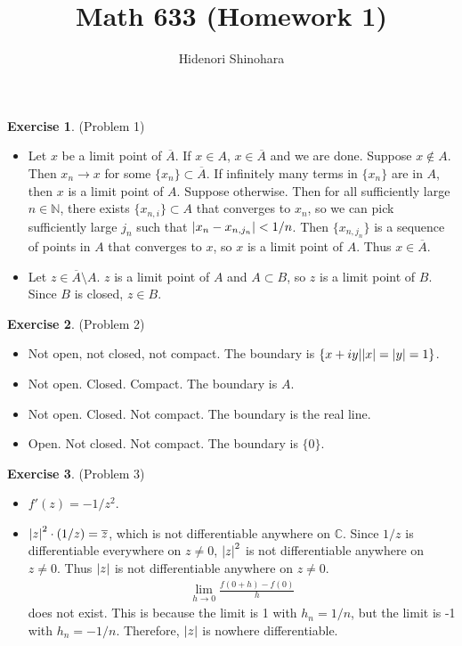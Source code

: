 \documentclass[12pt, psamsfonts]{amsart}
\theoremstyle{definition}
\newtheorem*{exer}{Exercise}
\theoremstyle{remark}
\numberwithin{equation}{section}
\begin{document}
\title{Math 633 (Homework 1)}
\author{Hidenori Shinohara}
\maketitle

\begin{exer}{(Problem 1)}
  \begin{itemize}
    \item
      Let $x$ be a limit point of $\overline{A}$.
      If $x \in A$, $x \in \overline{A}$ and we are done.
      Suppose $x \notin A$.
      Then $x_n \rightarrow x$ for some $\{ x_n \} \subset \overline{A}$.
      If infinitely many terms in $\{ x_n \}$ are in $A$, then $x$ is a limit point of $A$.
      Suppose otherwise.
      Then for all sufficiently large $n \in \mathbb{N}$, there exists $\{ x_{n, i} \} \subset A$ that converges to $x_n$, so we can pick sufficiently large $j_n$ such that $\abs{x_n - x_{n, j_n}} < 1 / n$.
      Then $\{ x_{n, j_n} \}$ is a sequence of points in $A$ that converges to $x$, so $x$ is a limit point of $A$.
      Thus $x \in \overline{A}$.
    \item
      Let $z \in \overline{A} \setminus A$.
      $z$ is a limit point of $A$ and $A \subset B$, so $z$ is a limit point of $B$.
      Since $B$ is closed, $z \in B$.
  \end{itemize}
\end{exer}

\begin{exer}{(Problem 2)}
 \begin{itemize}
   \item
     Not open, not closed, not compact. The boundary is $\{ x + iy | \abs{x} = \abs{y} = 1 \}$.
   \item
     Not open. Closed. Compact. The boundary is $A$.
   \item
     Not open. Closed. Not compact. The boundary is the real line.
   \item
     Open. Not closed. Not compact. The boundary is $\{ 0 \}$.
 \end{itemize}
\end{exer}

\begin{exer}{(Problem 3)}
 \begin{itemize}
   \item
     $f'(z) = -1/z^2$.
   \item
     $\abs{z}^2 \cdot (1/z) = \overline{z}$, which is not differentiable anywhere on $\mathbb{C}$.
     Since $1 / z$ is differentiable everywhere on $z \ne 0$, $\abs{z}^2$ is not differentiable anywhere on $z \ne 0$.
     Thus $\abs{z}$ is not differentiable anywhere on $z \ne 0$.
     \begin{align*}
        \lim_{h \rightarrow 0} \frac{f(0 + h) - f(0)}{h}
     \end{align*}
     does not exist.
     This is because the limit is 1 with $h_n = 1 / n$, but the limit is -1 with $h_n = -1/n$.
     Therefore, $\abs{z}$ is nowhere differentiable.
 \end{itemize}
\end{exer}
\end{document}
